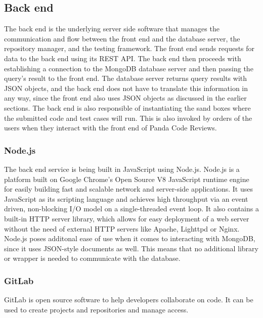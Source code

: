 \subsection{Back end}

The back end is the underlying server side software that manages the
communication and flow between the front end and the database server, the
repository manager, and the testing framework. The front end sends requests for
data to the back end using its REST API. The back end then proceeds with
establishing a connection to the MongoDB database server and then passing the
query's result to the front end. The database server returns query results with
JSON objects, and the back end does not have to translate this information in
any way, since the front end also uses JSON objects as discussed in the earlier
sections. The back end is also responsible of instantiating the sand boxes where
the submitted code and test cases will run. This is also invoked by orders of
the users when they interact with the front end of Panda Code Reviews.


\subsubsection{Node.js}


The back end service is being built in JavaScript using Node.js. Node.js is a
platform built on Google Chrome's Open Source V8 JavaScript runtime engine for
easily building fast and scalable network and server-side applications. It uses
JavaScript as its scripting language and achieves high throughput via an event
driven, non-blocking I/O model on a single-threaded event loop. It also contains
a built-in HTTP server library, which allows for easy deployment of a web server
without the need of external HTTP servers like Apache, Lighttpd or Nginx.
Node.js poses additonal ease of use when it comes to interacting with MongoDB,
since it uses JSON-style documents as well. This means that no additional
library or wrapper is needed to communicate with the database.

\subsubsection{GitLab}

GitLab is open source software to help developers collaborate on code. It can be
used to create projects and repositories and manage access.

